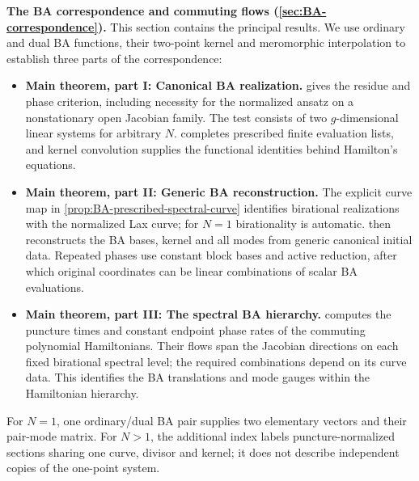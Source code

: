 \noindent\textbf{The BA correspondence and commuting flows
(\cref{sec:BA-correspondence}).}
This section contains the principal results. We use ordinary and dual
BA functions, their two-point kernel and meromorphic interpolation to
establish three parts of the correspondence:
\begin{itemize}
\item \textbf{Main theorem, part I: Canonical BA realization.}
 gives the residue and phase criterion,
including necessity for the normalized ansatz on a nonstationary open
Jacobian family. The test consists of two $g$-dimensional linear
systems for arbitrary $N$.  completes
prescribed finite evaluation lists, and kernel convolution supplies
the functional identities behind Hamilton's equations.
\item \textbf{Main theorem, part II: Generic BA reconstruction.}
The explicit curve map in \cref{prop:BA-prescribed-spectral-curve}
identifies birational realizations with the normalized Lax curve;
for $N=1$ birationality is automatic.
 then reconstructs the BA bases, kernel
and all modes from generic canonical initial data. Repeated phases
use constant block bases and active reduction, after which original
coordinates can be linear combinations of scalar BA evaluations.
\item \textbf{Main theorem, part III: The spectral BA hierarchy.}
 computes the puncture times and constant
endpoint phase rates of the commuting polynomial Hamiltonians.
Their flows span the Jacobian directions on each fixed birational
spectral level; the required combinations depend on its curve data.
This identifies the BA translations and mode gauges within the
Hamiltonian hierarchy.
\end{itemize}
For $N=1$, one ordinary/dual BA pair supplies two elementary vectors
and their pair-mode matrix. For $N>1$, the additional index labels
puncture-normalized sections sharing one curve, divisor and kernel;
it does not describe independent copies of the one-point system.

